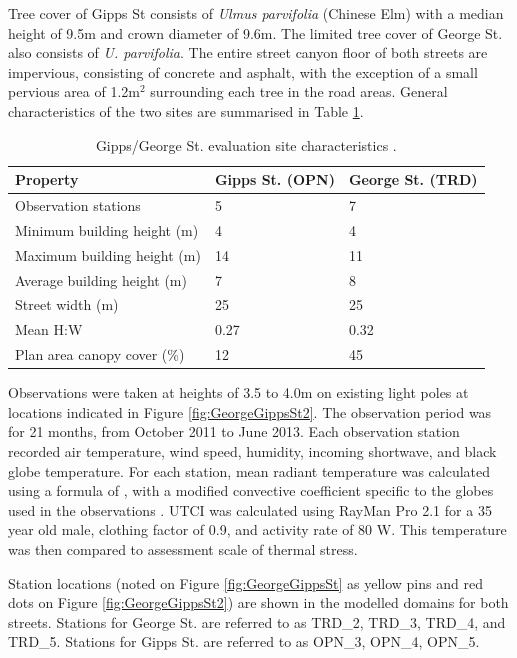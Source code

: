 \documentclass[final,3p,times,authoryear]{elsarticle}
\begin{document}
Tree cover of Gipps St consists of \textit{Ulmus parvifolia} (Chinese Elm) with a median height of 9.5m and crown diameter of 9.6m. The limited tree cover of George St. also consists of \textit{U. parvifolia}. The entire street canyon floor of both streets are impervious, consisting of concrete and asphalt, with the exception of a small pervious area of 1.2m$^{2}$ surrounding each tree in the road areas. General characteristics of the two sites are summarised in Table \ref{tab:comvalpara}.

\begin{table}[!htbp]
\caption{Gipps/George St. evaluation site characteristics \citep{Coutts2015}. \label{tab:comvalpara}}     
\begin{tabular}{| l | l |l|}
\hline
\textbf{Property} & \textbf{Gipps St. (OPN)} & \textbf{George St. (TRD)} \\ \hline
Observation stations & 5 & 7\\ \hline
Minimum building height (m) & 4 & 4\\ \hline
Maximum building height (m) & 14 & 11\\ \hline
Average building height (m) & 7 & 8 \\ \hline
Street width (m) & 25 & 25 \\ \hline
Mean H:W & 0.27 & 0.32 \\ \hline
Plan area canopy cover (\%) & 12 & 45 \\ \hline

\end{tabular}
\end{table}

Observations were taken at heights of 3.5 to 4.0m on existing light poles at locations indicated in Figure \ref{fig:GeorgeGippsSt2}. The observation period was for 21 months, from October 2011 to June 2013. Each observation station recorded air temperature, wind speed, humidity, incoming shortwave, and black globe temperature. For each station, mean radiant temperature was calculated using a formula of \cite{Kantor2011}, with a modified convective coefficient specific to the globes used in the observations \citep{Coutts2015,Coutts2016c}. UTCI was calculated using RayMan Pro 2.1 \citep{Matzarakis2010} for a 35 year old male, clothing factor of 0.9, and activity rate of 80 W. This temperature was then compared to \cite{Brode2012a} assessment scale of thermal stress.

Station locations (noted on Figure \ref{fig:GeorgeGippsSt} as yellow pins and red dots on Figure \ref{fig:GeorgeGippsSt2}) are shown in the modelled domains for both streets. Stations for George St. are referred to as TRD\_2, TRD\_3, TRD\_4, and TRD\_5. Stations for Gipps St. are referred to as OPN\_3, OPN\_4, OPN\_5. 
\end{document}
